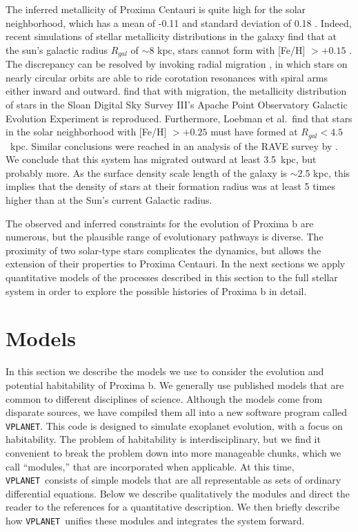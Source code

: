 \documentclass[preprint,12pt]{aastex}
\newcommand{\xxx}[1]{{\color{red} #1}} %
\def\vplanet{\texttt{\footnotesize{VPLANET}}\xspace}
\begin{document}
The \xxx{inferred} metallicity of Proxima Centauri is quite high for the solar
neighborhood, which has a mean of -0.11 and standard deviation of 0.18
\citep{AllendePrieto04}. Indeed, recent simulations of stellar
metallicity distributions in the galaxy find that at the sun's
galactic radius $R_{gal}$ of $\sim$8 kpc, stars cannot form with
[Fe/H] $> +0.15$ \citep{Loebman16}. The discrepancy can be resolved by
invoking radial migration \citep{SellwoodBinney02}, in which stars on
nearly circular orbits are able to ride corotation resonances with
spiral arms either inward and outward. \cite{Loebman16} find that with
migration, the metallicity distribution of stars in the Sloan Digital
Sky Survey III's Apache Point Observatory Galactic Evolution
Experiment \citep{Hayden15} is reproduced. Furthermore, Loebman et
al.\ find that stars in the solar neighborhood with [Fe/H] $> +0.25$
must have formed at $R_{gal} < 4.5$~kpc.
\xxx{Similar conclusions were reached in an analysis of the RAVE
  survey by \citep{Kordopatis15}.}
We conclude that this system
has migrated outward at least 3.5~kpc, but probably more. As the surface
density scale length of the galaxy is $\sim$2.5 kpc, this implies that
the density of stars at their formation radius was at least 5 times
higher than at the Sun's current Galactic radius.

The observed and inferred constraints for the evolution of Proxima b
are numerous, but the plausible range of evolutionary pathways is
diverse. The proximity of two solar-type stars complicates the
dynamics, but allows the extension of their properties to Proxima
Centauri. In the next sections we apply quantitative models of the
processes described in this section to the full stellar system in order to
explore the possible histories of Proxima b in detail.


\section{Models\label{sec:models}}

In this section we describe the models we use to consider the
evolution and potential habitability of Proxima b. We generally use
published models that are common to different disciplines of
science. Although the models come from disparate sources, we have
compiled them all into a new software program called \vplanet. This
code is designed to simulate exoplanet evolution, with a focus on
habitability. The problem of habitability is interdisciplinary, but we
find it convenient to break the problem down into more manageable
chunks, which we call ``modules,'' that are incorporated when
applicable. At this time, \vplanet~consists of simple models that are
all representable as sets of ordinary differential equations. Below we
describe qualitatively the modules and direct the reader to the
references for a quantitative description. We then briefly describe
how \vplanet~unifies these modules and integrates the system forward.
\end{document}
